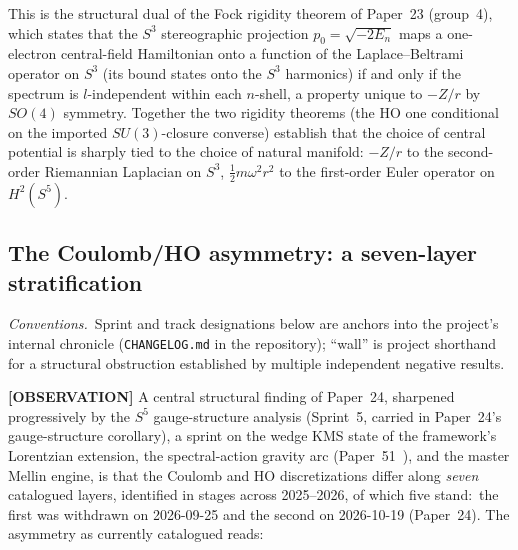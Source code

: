 \documentclass[aps,pra,twocolumn,superscriptaddress,longbibliography]{revtex4-2}
\begin{document}
This is the structural dual of the Fock rigidity theorem of Paper~23
(group~4), which states that the $S^3$ stereographic
projection $p_0 = \sqrt{-2 E_n}$ maps a one-electron central-field
Hamiltonian onto a function of the Laplace--Beltrami operator on $S^3$
(its bound states onto the $S^3$ harmonics) if and only if the
spectrum is $l$-independent within each $n$-shell, a property unique
to $-Z/r$ by $SO(4)$ symmetry.  Together the two rigidity theorems
(the HO one conditional on the imported $SU(3)$-closure converse)
establish that the choice of central potential is sharply tied to the
choice of natural manifold: $-Z/r$ to the second-order Riemannian
Laplacian on $S^3$, $\tfrac{1}{2} m \omega^2 r^2$ to the first-order
Euler operator on $H^2(S^5)$.

\subsection*{The Coulomb/HO asymmetry: a seven-layer stratification}

\emph{Conventions.}\ Sprint and track designations below are anchors into the
project's internal chronicle (\texttt{CHANGELOG.md} in the repository); ``wall''
is project shorthand for a structural obstruction established by multiple
independent negative results.

\textbf{[OBSERVATION]} A central structural finding of Paper~24, sharpened progressively by
the $S^5$ gauge-structure analysis (Sprint~5, carried in Paper~24's gauge-structure corollary), a
sprint on the wedge KMS state of the framework's Lorentzian extension,
the spectral-action gravity arc (Paper~51~\cite{loutey_paper51}), and the master Mellin
engine, is that the Coulomb and HO discretizations differ along
\emph{seven} catalogued layers, identified in stages across 2025--2026,
of which five stand:\ the first was withdrawn on 2026-09-25 and the
second on 2026-10-19 (Paper~24).
The asymmetry as currently catalogued reads:
\end{document}
